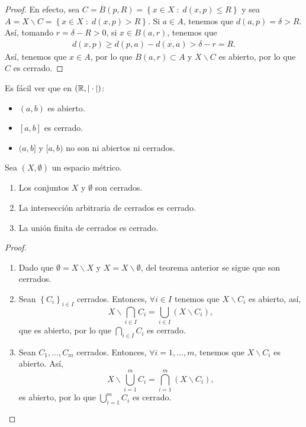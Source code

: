 \begin{proof}
En efecto, sea $\displaystyle C = \overline{B}\left(p, R\right) = \left\{ x \in X \; : \; d\left(x,p\right) \leq R\right\}  $ y sea $\displaystyle A = X\backslash C = \left\{ x \in X \; : \; d\left(x, p\right) > R\right\}  $. Si $\displaystyle a \in A $, tenemos que $\displaystyle d\left(a,p\right) = \delta > R $. Así, tomando $\displaystyle r = \delta - R > 0 $, si $\displaystyle x\in B\left(a,r\right)  $, tenemos que 
	 \[
	 \begin{split}
	 d\left(x,p\right) \geq d\left(p,a\right)- d\left(x,a\right) > \delta - r = R.
	 \end{split}
	 \]
	 Así, tenemos que $\displaystyle x \in A $, por lo que $\displaystyle B\left(a,r\right) \subset A $ y $\displaystyle X \backslash C $ es abierto, por lo que $\displaystyle C $ es cerrado.
\end{proof}
\begin{observation}
Es fácil ver que en $\displaystyle \left(\mathbb{R}, | \cdot |\right) $:
\begin{itemize}
\item $\displaystyle \left(a,b\right) $ es abierto.
\item $\displaystyle \left[a,b\right]  $ es cerrado.
\item $\displaystyle (a,b]  $ y $\displaystyle [a,b) $ no son ni abiertos ni cerrados.
\end{itemize}
\end{observation}
\begin{theorem}
Sea $\displaystyle \left(X, \emptyset\right) $ un espacio métrico.
\begin{enumerate}
\item Los conjuntos $\displaystyle X $ y $\displaystyle \emptyset $ son cerrados.
\item La intersección arbitraria de cerrados es cerrado.
\item La unión finita de cerrados es cerrado.
\end{enumerate}
\end{theorem}
\begin{proof}
\begin{enumerate}
\item Dado que $\displaystyle \emptyset = X \backslash X $ y $\displaystyle X = X\backslash \emptyset $, del teorema anterior se sigue que son cerrados.
\item Sean $\displaystyle \left\{ C_{i}\right\} _{i \in I} $ cerrados. Entonces, $\displaystyle \forall i \in I $ tenemos que $\displaystyle X \backslash C_{i} $ es abierto, así,
	\[X \backslash \bigcap_{i \in I}C_{i} = \bigcup_{i \in I}\left(X \backslash C_{i}\right) ,\]
	que es abierto, por lo que $\displaystyle \bigcap_{i \in I}C_{i} $ es cerrado.
\item Sean $\displaystyle C_{1}, \ldots, C_{m} $ cerrados. Entonces, $\displaystyle \forall i = 1, \ldots, m $, tenemos que $\displaystyle X \backslash C_{i} $ es abierto. Así,
	\[X\backslash\bigcup_{i = 1}^{m}C_{i} = \bigcap_{i = 1}^{m}\left(X \backslash C_{i}\right) ,\]
	es abierto, por lo que $\displaystyle \bigcup_{i = 1}^{m}C_{i} $ es cerrado.
\end{enumerate}
\end{proof}
